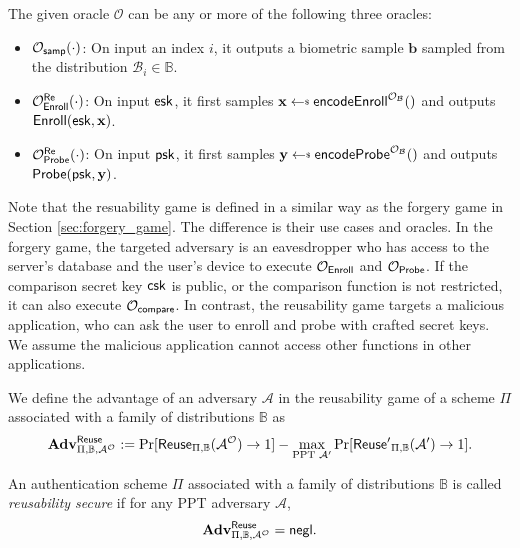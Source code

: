 The given oracle $\mathcal{O}$ can be any or more of the following three oracles:

\begin{itemize}
	\item $\mathcal{O}_{\sf samp}(\cdot)$: On input an index $i$, it outputs a biometric sample $\mathbf{b}$ sampled from the distribution $\mathcal{B}_i \in \mathbb{B}$.

	\item $\mathcal{O}_{\sf Enroll}^{ {\sf Re}} (\cdot)$: On input ${\sf esk}$, it first samples $\mathbf{x} \getsdollar {\sf encodeEnroll}^{\mathcal{O}_{\mathcal{B}}}()$ and outputs ${\sf Enroll}({\sf esk}, \mathbf{x})$.
	
	\item $\mathcal{O}_{\sf Probe}^{ {\sf Re}} (\cdot)$: On input ${\sf psk}$, it first samples $\mathbf{y} \getsdollar {\sf encodeProbe}^{\mathcal{O}_{\mathcal{B}}}()$ and outputs ${\sf Probe}({\sf psk}, \mathbf{y})$.

\end{itemize}

Note that the resuability game is defined in a similar way as the forgery game in Section \ref{sec:forgery_game}. The difference is their use cases and oracles. In the forgery game, the targeted adversary is an eavesdropper who has access to the server's database and the user's device to execute $\mathcal{O}_{\sf Enroll}$ and $\mathcal{O}_{\sf Probe}$. If the comparison secret key ${\sf csk}$ is public, or the comparison function is not restricted, it can also execute $\mathcal{O}_{\sf compare}$. In contrast, the reusability game targets a malicious application, who can ask the user to enroll and probe with crafted secret keys. We assume the malicious application cannot access other functions in other applications.

We define the advantage of an adversary $\mathcal{A}$ in the reusability game of a scheme $\Pi$ associated with a family of distributions $\mathbb{B}$ as
\[
	\mathbf{Adv}^{\sf Reuse}_{\Pi, \mathbb{B}, \mathcal{A}^\mathcal{O}} := \Pr[{\sf Reuse}_{\Pi, \mathbb{B}}(\mathcal{A}^\mathcal{O}) \to 1] -
	\max_{\text{PPT } \mathcal{A}'} \Pr[{\sf Reuse'}_{\Pi, \mathbb{B}}(\mathcal{A}') \to 1].
\]

An authentication scheme $\Pi$ associated with a family of distributions $\mathbb{B}$ is called \emph{reusability secure} if for any PPT adversary $\mathcal{A}$,
\[
	\mathbf{Adv}^{\sf Reuse}_{\Pi, \mathbb{B}, \mathcal{A^\mathcal{O}}} = \mathsf{negl}.
\]



